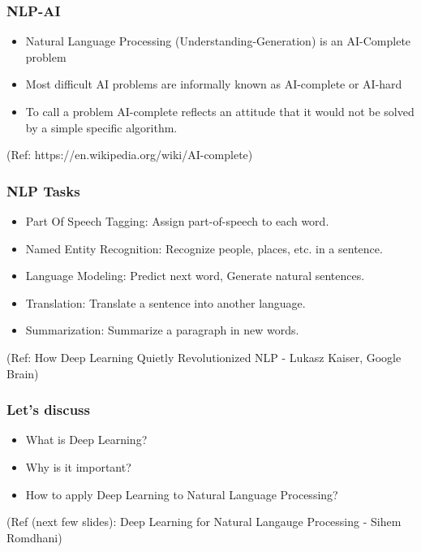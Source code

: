 \begin{frame}[fragile]\frametitle{NLP-AI}
	\begin{itemize}
	\item Natural Language Processing (Understanding-Generation) is an AI-Complete problem
	\item Most difficult AI problems are informally known as AI-complete or AI-hard 
	\item To call a problem AI-complete reflects an attitude that it would not be solved by a simple specific algorithm.
	\end{itemize}

\tiny{(Ref: https://en.wikipedia.org/wiki/AI-complete)}
\end{frame}

\begin{frame}[fragile]\frametitle{NLP Tasks}
	\begin{itemize}
	\item Part Of Speech Tagging: Assign part-of-speech to each word.
	\item Named Entity Recognition: Recognize people, places, etc. in a sentence.
	\item Language Modeling: Predict next word, Generate natural sentences.
	\item Translation:  Translate a sentence into another language.
	\item  Summarization: Summarize a paragraph in new words.
	\end{itemize}

\tiny{(Ref: How Deep Learning Quietly Revolutionized NLP - Lukasz Kaiser, Google Brain)}
\end{frame}

\begin{frame}[fragile]\frametitle{Let's discuss}
	\begin{itemize}
	\item What is Deep Learning? 
	\item Why is it important?
	\item How to apply Deep Learning to Natural Language Processing?
	\end{itemize}

\tiny{(Ref (next few slides):  Deep Learning for Natural Langauge Processing - Sihem Romdhani)}

\end{frame}



